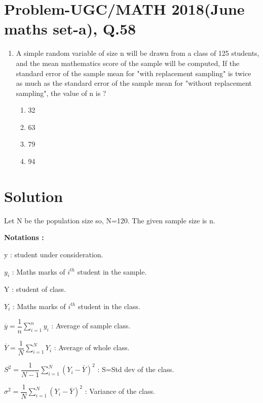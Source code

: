\documentclass[journal,12pt,twocolumn]{IEEEtran}
\begin{document}
\section*{Problem-UGC/MATH 2018(June maths set-a), Q.58}
\begin{enumerate}
\item A simple random variable of size n will be drawn from a class of 125 students, and the mean mathematics score of the sample will be computed, If the standard error of the sample mean for "with replacement sampling" is twice as much as the standard error of the sample mean for "without replacement sampling", the value of n is ? 
	\begin{enumerate}
	\item 32
	\item 63
	\item 79
	\item 94
	\end{enumerate}
\end{enumerate}

\section*{Solution}
Let N be the population size so, N=120. The given sample size is n.

\textbf{Notations :}

y : student under consideration.

$y_i$ : Maths marks of $i^{th}$ student in the sample.

Y : student of class.

$Y_i$ : Maths marks of $i^{th}$ student in the class.

$\overline{y}=\dfrac{1}{n}\sum_{i=1}^{n}y_i$ : Average of sample class.

$\overline{Y}=\dfrac{1}{N}\sum_{i=1}^{N}Y_i$ : Average of whole class.

$S^2 = \dfrac{1}{N-1} \sum_{i=1}^{N} (Y_i-\bar{Y})^2$ : S=Std dev of the class.

$\sigma^2=\dfrac{1}{N} \sum_{i=1}^{N} (Y_i-\bar{Y})^2$ : Variance of the class.
\end{document}
